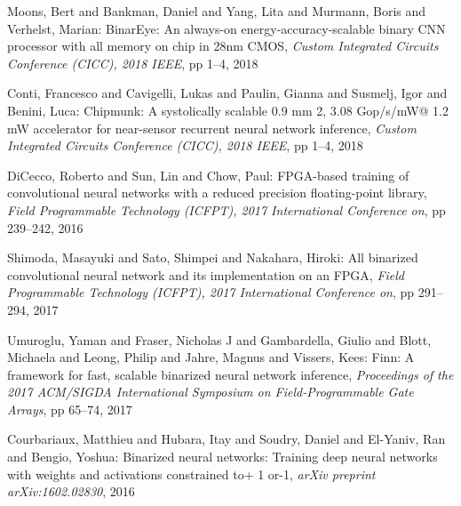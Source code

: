 \documentclass[techrep,english]{ipsj}
\begin{document}
\begin{thebibliography}{99}
  Moons, Bert and Bankman, Daniel and Yang, Lita and Murmann, Boris and Verhelst, Marian:
  BinarEye: An always-on energy-accuracy-scalable binary CNN processor with all memory on chip in 28nm CMOS,
  {\it Custom Integrated Circuits Conference (CICC), 2018 IEEE},
  pp 1–4, 2018


  Conti, Francesco and Cavigelli, Lukas and Paulin, Gianna and Susmelj, Igor and Benini, Luca:
  Chipmunk: A systolically scalable 0.9 mm 2, 3.08 Gop/s/mW@ 1.2 mW accelerator for near-sensor recurrent neural network inference,
  {\it Custom Integrated Circuits Conference (CICC), 2018 IEEE},
  pp 1–4, 2018

  DiCecco, Roberto and Sun, Lin and Chow, Paul:
  FPGA-based training of convolutional neural networks with a reduced precision floating-point library,
  {\it  Field Programmable Technology (ICFPT), 2017 International Conference on},
  pp 239–242, 2016

  Shimoda, Masayuki and Sato, Shimpei and Nakahara, Hiroki:
  All binarized convolutional neural network and its implementation on an FPGA,
  {\it  Field Programmable Technology (ICFPT), 2017 International Conference on},
  pp 291–294, 2017

  Umuroglu, Yaman and Fraser, Nicholas J and Gambardella, Giulio and Blott, Michaela and Leong, Philip and Jahre, Magnus and Vissers, Kees:
  Finn: A framework for fast, scalable binarized neural network inference,
  {\it  Proceedings of the 2017 ACM/SIGDA International Symposium on Field-Programmable Gate Arrays},
  pp 65–74, 2017


  Courbariaux, Matthieu and Hubara, Itay and Soudry, Daniel and El-Yaniv, Ran and Bengio, Yoshua:
  Binarized neural networks: Training deep neural networks with weights and activations constrained to+ 1 or-1,
  {\it arXiv preprint arXiv:1602.02830},
  2016
  
\end{thebibliography}  
\end{document}

